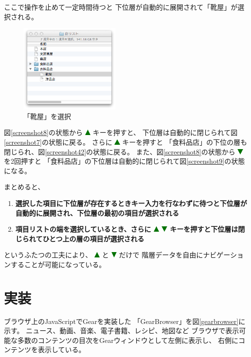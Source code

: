 \documentclass[twoside]{wiss}
\def\GEAR{\textsf{Gear}}
\def\GB{\textsf{GearBrowser}}
\def\figwidth{50mm}
\def\up{ \includegraphics[width=3mm,bb=0 0 36 36]{figures/uptriangle.pdf} }
\def\down{ \includegraphics[width=3mm,bb=0 0 36 36]{figures/downtriangle.pdf} }
\begin{document}
\noindent
ここで操作を止めて一定時間待つと
下位層が自動的に展開されて「靴屋」が選択される。

\begin{figure}[H]
\centerline{\includegraphics[width=\figwidth,bb=0 0 344 304]{figures/fddd5777d39924ea3f0220ae39a604c1.png}}
\caption{「靴屋」を選択}
\label{screenshot10}
\end{figure}

図\ref{screenshot8}の状態から{\up}キーを押すと、
下位層は自動的に閉じられて図\ref{screenshot7}の状態に戻る。 
さらに{\up}キーを押すと
「食料品店」の下位の層も閉じられ、図\ref{screenshot42}の状態に戻る。
%
また、図\ref{screenshot8}の状態から{\down}を2回押すと
「食料品店」の下位層は自動的に閉じられて図\ref{screenshot9}の状態になる。

まとめると、

\begin{enumerate}
\item \textbf{選択した項目に下位層が存在するときキー入力を行なわずに待つと下位層が自動的に展開され、下位層の最初の項目が選択される}
\item \textbf{項目リストの端を選択しているとき、さらに{\up}{\down}キーを押すと下位層は閉じられてひとつ上の層の項目が選択される}
\end{enumerate}

\noindent
というふたつの工夫により、
{\up}と{\down}だけで
階層データを自由にナビゲーションすることが可能になっている。

\section{実装}

ブラウザ上のJavaScriptで{\GEAR}を実装した
「{\GB}」を図\ref{gearbrowser}に示す。
ニュース、動画、音楽、電子書籍、レシピ、地図など
ブラウザで表示可能な多数のコンテンツの目次を{\GEAR}ウィンドウとして左側に表示し、
右側にコンテンツを表示している。
\end{document}
